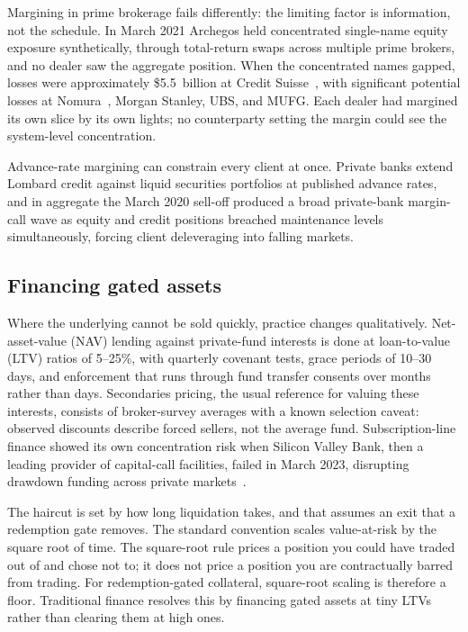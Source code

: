 \documentclass[11pt,a4paper]{article}
\begin{document}
Margining in prime brokerage fails differently: the limiting factor is information, not the schedule. In March 2021 Archegos held concentrated single-name equity exposure synthetically, through total-return swaps across multiple prime brokers, and no dealer saw the aggregate position. When the concentrated names gapped, losses were approximately \$5.5~billion at Credit Suisse~\cite{archegos}, with significant potential losses at Nomura~\cite{nomura}, Morgan Stanley, UBS, and MUFG. Each dealer had margined its own slice by its own lights; no counterparty setting the margin could see the system-level concentration.

Advance-rate margining can constrain every client at once. Private banks extend Lombard credit against liquid securities portfolios at published advance rates, and in aggregate the March 2020 sell-off produced a broad private-bank margin-call wave as equity and credit positions breached maintenance levels simultaneously, forcing client deleveraging into falling markets.

\subsection{Financing gated assets}

Where the underlying cannot be sold quickly, practice changes qualitatively. Net-asset-value (NAV) lending against private-fund interests is done at loan-to-value (LTV) ratios of 5--25\%, with quarterly covenant tests, grace periods of 10--30 days, and enforcement that runs through fund transfer consents over months rather than days. Secondaries pricing, the usual reference for valuing these interests, consists of broker-survey averages with a known selection caveat: observed discounts describe forced sellers, not the average fund. Subscription-line finance showed its own concentration risk when Silicon Valley Bank, then a leading provider of capital-call facilities, failed in March 2023, disrupting drawdown funding across private markets~\cite{svb}.

The haircut is set by how long liquidation takes, and that assumes an exit that a redemption gate removes. The standard convention scales value-at-risk by the square root of time. The square-root rule prices a position you could have traded out of and chose not to; it does not price a position you are contractually barred from trading. For redemption-gated collateral, square-root scaling is therefore a floor. Traditional finance resolves this by financing gated assets at tiny LTVs rather than clearing them at high ones.
\end{document}
